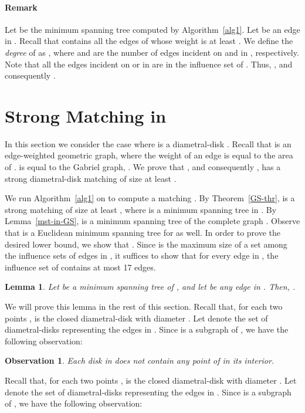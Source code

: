 \documentclass[11pt,a4paper]{article}
\newtheorem{lemma}{Lemma}
\newtheorem{observation}{Observation}
\begin{document}
\paragraph{Remark}
Let  be the minimum spanning tree computed by Algorithm~\ref{alg1}. Let  be an edge in . Recall that  contains all the edges of  whose weight is at least . We define the {\em degree} of  as , where  and  are the number of edges incident on  and  in , respectively. Note that all the edges incident on  or  in  are in the influence set of . Thus, , and consequently .

\section{Strong Matching in }
\label{Gabriel-section}
In this section we consider the case where  is a diametral-disk . Recall that  is an edge-weighted geometric graph, where the weight of an edge  is equal to the area of .  is equal to the Gabriel graph, . We prove that , and consequently , has a strong diametral-disk matching of size at least . 

We run Algorithm~\ref{alg1} on  to compute a matching . By Theorem~\ref{GS-thr},  is a strong matching of size at least , where  is a minimum spanning tree in . By Lemma~\ref{mst-in-GS},  is a minimum spanning tree of the complete graph . Observe that  is a Euclidean minimum spanning tree for  as well. In order to prove the desired lower bound, we show that . Since  is the maximum size of a set among the
influence sets of edges in , it suffices to show that for every edge  in , the influence set of  contains at most 17 edges. 
\begin{lemma}
\label{disk-inf-lemma}
Let  be a minimum spanning tree of , and let  be any edge in . Then, .
\end{lemma}
We will prove this lemma in the rest of this section. Recall that, for each two points ,  is the closed diametral-disk with diameter . Let  denote the set of diametral-disks representing the edges in . Since  is a subgraph of , we have the following observation:

\begin{observation}
\label{no-point-in-circle-obs}
 Each disk in  does not contain any point of  in its interior.
\end{observation}

Recall that, for each two points ,  is the closed diametral-disk with diameter . Let  denote the set of diametral-disks representing the edges in . Since  is a subgraph of , we have the following observation:
\end{document}
